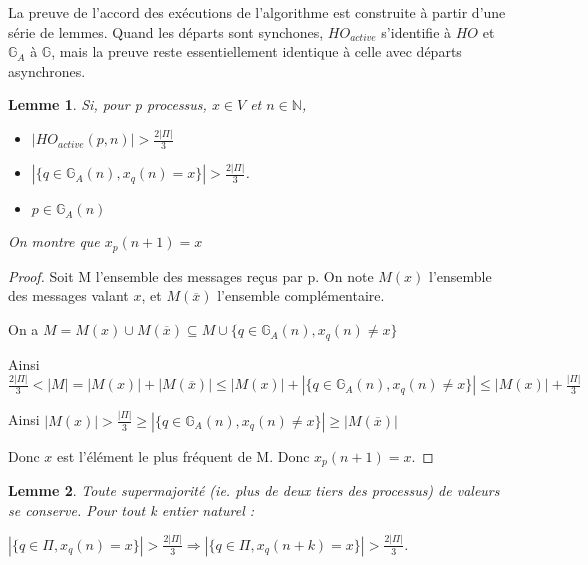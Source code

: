 \documentclass{article}
\newtheorem{lemma}{Lemme}
\begin{document}
La preuve de l'accord des exécutions de l'algorithme est construite à partir d'une série de lemmes.
Quand les départs sont synchones, $HO_{active}$ s'identifie à $HO$ et $\mathds{G}_A$ à $\mathds{G}$, mais la preuve reste essentiellement identique à celle avec départs asynchrones.

\begin{lemma}

	Si, pour p processus, $x \in V$ et $n \in \mathds{N}$, 

\begin{itemize}

\item $| HO_{active} (p,n) | > \frac{2|\Pi|}{3}$
\item $| \{ q \in \mathds{G}_A(n) , x_q(n) = x \} | > \frac{2|\Pi|}{3}$.
\item $p \in \mathds{G}_A(n)$

\end{itemize}

On montre que $x_p(n+1) = x$

\end{lemma}

\begin{proof}

	Soit M l'ensemble des messages reçus par p. On note $M(x)$ l'ensemble des messages valant $x$, et $M(\overline{x})$ l'ensemble complémentaire.

On a $M = M(x) \cup M(\overline{x}) \subseteq M \cup \{ q \in \mathds{G}_A(n) , x_q(n) \neq x \} $

\vspace{0.4cm}

	Ainsi $\frac{2|\Pi|}{3} < | M | = | M(x) | + | M(\overline{x}) | \leq | M(x) | + | \{ q \in \mathds{G}_A(n) , x_q(n) \neq x \} | \leq | M(x) | +  \frac{|\Pi|}{3}$

\vspace{0.4cm}

Ainsi  $| M(x) | > \frac{|\Pi|}{3} \geq | \{ q \in \mathds{G}_A(n) , x_q(n) \neq x \} | \geq | M(\overline{x}) |$

Donc $x$ est l'élément le plus fréquent de M. Donc $x_p(n+1) = x$.

\end{proof}

\begin{lemma}

Toute supermajorité (ie. plus de deux tiers des processus) de valeurs se conserve. Pour tout k entier naturel : 

$| \{ q \in \Pi , x_q(n) = x \} | > \frac{2|\Pi|}{3} \Rightarrow | \{ q \in \Pi , x_q(n+k) = x \} | > \frac{2|\Pi|}{3}$.

\end{lemma}
\end{document}
